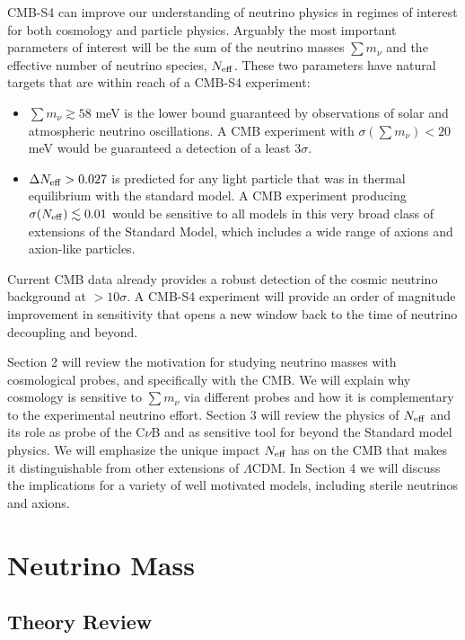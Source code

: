 CMB-S4 can improve our understanding of neutrino physics in regimes of interest for both cosmology and particle physics.  Arguably the most important parameters of interest will be the sum of the neutrino masses $\sum m_\nu$ and the effective number of neutrino species, $N_{\rm eff}$.  These two parameters have natural targets that are within reach of a CMB-S4 experiment:
\begin{itemize}
\item $ \sum m_\nu \gtrsim 58$ meV is the lower bound guaranteed by observations of solar and atmospheric neutrino oscillations.  A CMB experiment with $\sigma(\sum m_\nu) < 20$ meV would be guaranteed a detection of a least 3$\sigma$.
\item $\Delta N_{\rm eff} > 0.027$ is predicted for any light particle that was in thermal equilibrium with the standard model.  A CMB experiment producing $\sigma(N_{\rm eff}) \lesssim 0.01$ would be sensitive to all models in this very broad class of extensions of the Standard Model, which includes a wide range of axions and axion-like particles.  
\end{itemize}
Current CMB data already provides a robust detection of the cosmic neutrino background at $>10 \sigma$.  A CMB-S4 experiment will provide an order of magnitude improvement in sensitivity that opens a new window back to the time of neutrino decoupling and beyond.

Section 2 will review the motivation for studying neutrino masses with cosmological probes, and specifically with the CMB.  We will explain why cosmology is sensitive to $\sum m_\nu$ via different probes and how it is complementary to the experimental neutrino effort.  Section 3 will review the physics of $N_{\rm eff}$ and its role as probe of the C$\nu$B and as sensitive tool for beyond the Standard model physics.  We will emphasize the unique impact $N_{\rm eff}$ has on the CMB that makes it distinguishable from other extensions of $\Lambda$CDM.  In Section 4 we will discuss the implications for a variety of well motivated models, including sterile neutrinos and axions.   

\section{Neutrino Mass}

\subsection{Theory Review}

